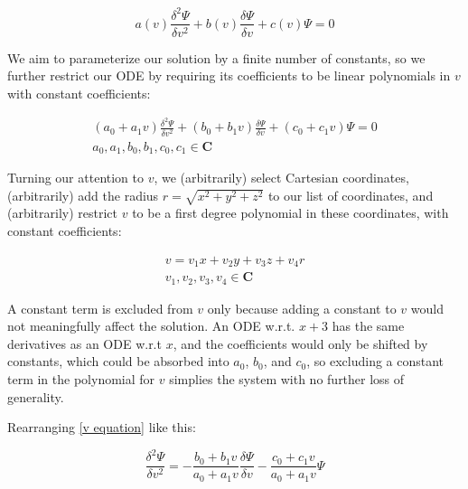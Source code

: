 \documentclass{article}
\begin{document}
\begin{equation}
a(v) \frac{\delta^2\Psi}{\delta v^2} + b(v) \frac{\delta\Psi}{\delta v} + c(v) \Psi = 0
\end{equation}

We aim to parameterize our solution by a finite number of constants, so we
further restrict our ODE by requiring its coefficients to be linear polynomials in $v$
with constant coefficients:

\begin{equation}
\label{v equation}
\begin{gathered}
(a_0 + a_1 v) \frac{\delta^2\Psi}{\delta v^2} + (b_0 + b_1 v) \frac{\delta\Psi}{\delta v} + (c_0 + c_1 v) \Psi = 0 \\
a_0, a_1, b_0, b_1, c_0, c_1 \in \mathbf{C}
\end{gathered}
\end{equation}

Turning our attention to $v$, we (arbitrarily) select Cartesian coordinates, (arbitrarily) add the radius $r=\sqrt{x^2+y^2+z^2}$
to our list of coordinates, and (arbitrarily) restrict $v$ to be a first degree polynomial in these coordinates,
with constant coefficients:

\begin{equation}
\begin{gathered}
\label{v form}
v = v_1 x + v_2 y + v_3 z + v_4 r \\
v_1, v_2, v_3, v_4 \in \mathbf{C}
\end{gathered}
\end{equation}

A constant term is excluded from $v$ only because adding a constant to $v$ would not meaningfully affect the
solution.  An ODE w.r.t. $x+3$ has the same derivatives as an ODE w.r.t $x$, and the coefficients would
only be shifted by constants, which could be absorbed into $a_0$, $b_0$, and $c_0$, so excluding a constant term
in the polynomial for $v$ simplies the system with no further loss of generality.

Rearranging \eqref{v equation} like this:

\begin{equation}
\label{rearranged v equation}
\frac{\delta^2\Psi}{\delta v^2} = - \frac{b_0 + b_1 v}{a_0 + a_1 v} \frac{\delta\Psi}{\delta v} - \frac{c_0 + c_1 v}{a_0 + a_1 v}\Psi
\end{equation}
\end{document}
